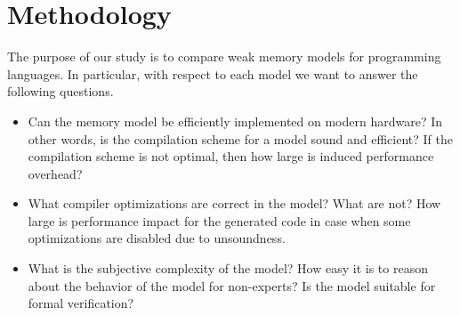 \section{Methodology}

The purpose of our study is to compare weak memory models for programming languages.
In particular, with respect to each model we want to answer the following questions.

\begin{itemize}
  
  \item Can the memory model be efficiently implemented on modern hardware? 
    In other words, is the compilation scheme for a model sound and efficient?
    If the compilation scheme is not optimal, then how large is induced performance overhead?

  \item What compiler optimizations are correct in the model? What are not? 
    How large is performance impact for the generated code in case when 
    some optimizations are disabled due to unsoundness.

  \item What is the subjective complexity of the model?
    How easy it is to reason about the behavior of the model for non-experts?
    Is the model suitable for formal verification?
  
\end{itemize}







